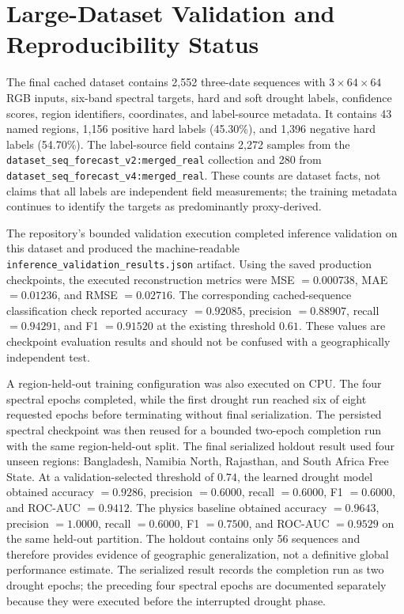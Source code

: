 \documentclass[11pt,a4paper]{article}
\begin{document}
\section{Large-Dataset Validation and Reproducibility Status}

The final cached dataset contains 2,552 three-date sequences with
$3\times64\times64$ RGB inputs, six-band spectral targets, hard and soft
drought labels, confidence scores, region identifiers, coordinates, and
label-source metadata.  It contains 43 named regions, 1,156 positive
hard labels (45.30\%), and 1,396 negative hard labels (54.70\%).  The
label-source field contains 2,272 samples from the
\texttt{dataset\_seq\_forecast\_v2:merged\_real} collection and 280 from
\texttt{dataset\_seq\_forecast\_v4:merged\_real}.  These counts are
dataset facts, not claims that all labels are independent field
measurements; the training metadata continues to identify the targets as
predominantly proxy-derived.

The repository's bounded validation execution completed inference
validation on this dataset and produced the machine-readable
\texttt{inference\_validation\_results.json} artifact.  Using the saved
production checkpoints, the executed reconstruction metrics were
MSE $=0.000738$, MAE $=0.01236$, and RMSE $=0.02716$.  The corresponding
cached-sequence classification check reported accuracy $=0.92085$,
precision $=0.88907$, recall $=0.94291$, and F1 $=0.91520$ at the
existing threshold $0.61$.  These values are checkpoint evaluation
results and should not be confused with a geographically independent
test.

A region-held-out training configuration was also executed on CPU.  The
four spectral epochs completed, while the first drought run reached six
of eight requested epochs before terminating without final
serialization.  The persisted spectral checkpoint was then reused for a
bounded two-epoch completion run with the same region-held-out split.
The final serialized holdout result used four unseen regions:
Bangladesh, Namibia North, Rajasthan, and South Africa Free State.  At a
validation-selected threshold of $0.74$, the learned drought model
obtained accuracy $=0.9286$, precision $=0.6000$, recall $=0.6000$,
F1 $=0.6000$, and ROC-AUC $=0.9412$.  The physics baseline obtained
accuracy $=0.9643$, precision $=1.0000$, recall $=0.6000$, F1 $=0.7500$,
and ROC-AUC $=0.9529$ on the same held-out partition.  The holdout
contains only 56 sequences and therefore provides evidence of geographic
generalization, not a definitive global performance estimate.  The
serialized result records the completion run as two drought epochs; the
preceding four spectral epochs are documented separately because they
were executed before the interrupted drought phase.
\end{document}
